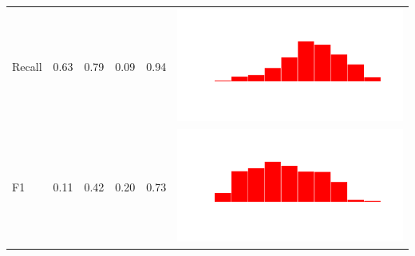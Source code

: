\documentclass[conference]{IEEEtran}
\begin{document}
\begin{table}
\begin{tabular}{lrrrrc}
    Recall & 0.63 & 0.79 & 0.09 & 0.94 & \includegraphics[scale = 0.1, clip = true, trim= 50px 60px 50px 60px]{../figs/hist-results/hist-NBrec.pdf} \\
    F1 & 0.11 & 0.42 & 0.20 & 0.73 & \includegraphics[scale = 0.1, clip = true, trim= 50px 60px 50px 60px]{../figs/hist-results/hist-NBf1.pdf} \\


\end{tabular}
\end{table}
\end{document}

